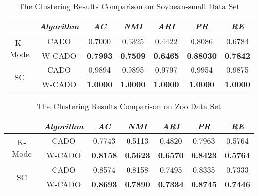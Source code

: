 \documentclass[review]{elsarticle}
\begin{document}
\begin{table}[!h]\tabcolsep=0.065in
\centering
\caption{The Clustering Results Comparison on Soybean-small Data Set}
\small
\label{tab:The Clustering Results Comparison on Soybean-small Data Set}
\begin{tabular}{c|c|c|c|c|c|c}
\hline
\emph{}&\emph{Algorithm}&\emph{AC}&\emph{NMI}&\emph{ARI}&\emph{PR}&\emph{RE} \\
\hline
\multirow{2}{*}{K-Mode} & CADO & 0.7000  & 0.6325  & 0.4422  & 0.8086  & 0.6784 \\
    & W-CADO & \textbf{0.7993} & \textbf{0.7509} & \textbf{0.6465} & \textbf{0.88030} & \textbf{0.7842}\\
    \hline
\multirow{2}{*}{SC} & CADO & 0.9894 & 0.9895 & 0.9797 & 0.9954 & 0.9875\\
    & W-CADO & \textbf{1.0000} & \textbf{1.0000} & \textbf{1.0000} & \textbf{1.0000} & \textbf{1.0000}\\
\hline
\end{tabular}
\end{table}

\begin{table}[!h]\tabcolsep=0.065in
\centering
\caption{The Clustering Results Comparison on Zoo Data Set}
\small
\label{tab:The Clustering Results Comparison on Zoo Data Set}
\begin{tabular}{c|c|c|c|c|c|c}
\hline
\emph{}&\emph{Algorithm}&\emph{AC}&\emph{NMI}&\emph{ARI}&\emph{PR}&\emph{RE} \\
\hline
\multirow{2}{*}{K-Mode} & CADO & 0.7743 & 0.5113 & 0.4820 & 0.7963 & 0.5764\\
    & W-CADO & \textbf{0.8158} & \textbf{0.5623} & \textbf{0.6570} & \textbf{0.8423} & \textbf{0.5764}\\
    \hline
\multirow{2}{*}{SC} & CADO & 0.8574 & 0.8158 & 0.7495 & 0.8335 & 0.7333\\
    & W-CADO & \textbf{0.8693} & \textbf{0.7890} & \textbf{0.7334} & \textbf{0.8745} & \textbf{0.7446}\\
\hline
\end{tabular}
\end{table}
\end{document}
